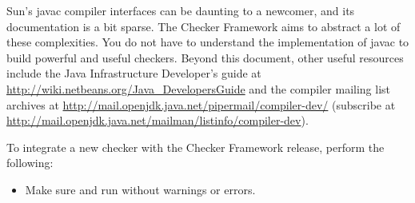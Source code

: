 
Sun's javac compiler interfaces can be daunting to a
newcomer, and its documentation is a bit sparse. The Checker Framework
aims to abstract a lot of these complexities.
You do not have to understand the implementation of javac to
build powerful and useful checkers.
Beyond this document,
other useful resources include the Java Infrastructure
Developer's guide at
\url{http://wiki.netbeans.org/Java_DevelopersGuide} and the compiler
mailing list archives at
\url{http://mail.openjdk.java.net/pipermail/compiler-dev/}
(subscribe at
\url{http://mail.openjdk.java.net/mailman/listinfo/compiler-dev}).




To integrate a new checker with the Checker Framework release, perform
the following:

\begin{itemize}

\item Make sure  and  run
without warnings or errors.

\end{itemize}


